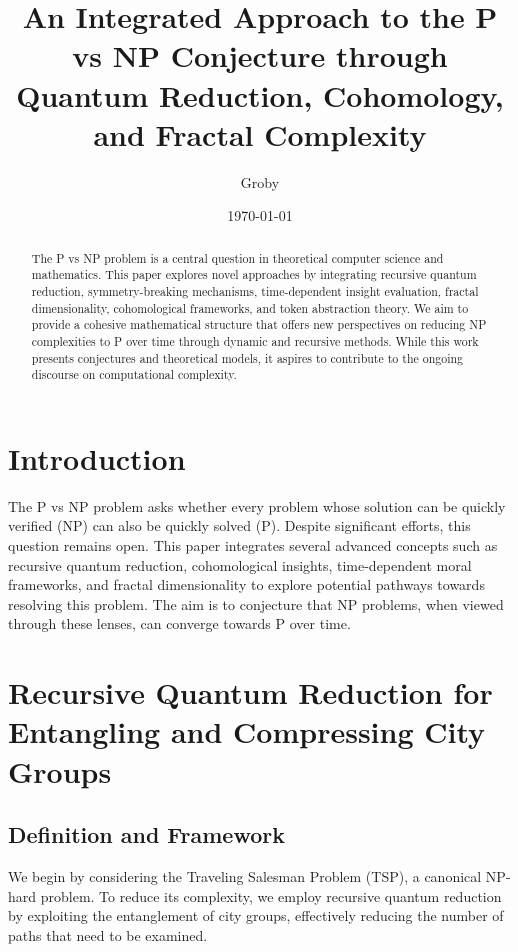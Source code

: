 \documentclass{article}
\title{An Integrated Approach to the P vs NP Conjecture through Quantum Reduction, Cohomology, and Fractal Complexity}
\author{Groby}
\date{\today}
\begin{document}
\maketitle

\begin{abstract}
The P vs NP problem is a central question in theoretical computer science and mathematics. This paper explores novel approaches by integrating recursive quantum reduction, symmetry-breaking mechanisms, time-dependent insight evaluation, fractal dimensionality, cohomological frameworks, and token abstraction theory. We aim to provide a cohesive mathematical structure that offers new perspectives on reducing NP complexities to P over time through dynamic and recursive methods. While this work presents conjectures and theoretical models, it aspires to contribute to the ongoing discourse on computational complexity.

\end{abstract}

\tableofcontents

\section{Introduction}

The P vs NP problem asks whether every problem whose solution can be quickly verified (NP) can also be quickly solved (P). Despite significant efforts, this question remains open. This paper integrates several advanced concepts such as recursive quantum reduction, cohomological insights, time-dependent moral frameworks, and fractal dimensionality to explore potential pathways towards resolving this problem. The aim is to conjecture that NP problems, when viewed through these lenses, can converge towards P over time.

\section{Recursive Quantum Reduction for Entangling and Compressing City Groups}

\subsection{Definition and Framework}

We begin by considering the Traveling Salesman Problem (TSP), a canonical NP-hard problem. To reduce its complexity, we employ recursive quantum reduction by exploiting the entanglement of city groups, effectively reducing the number of paths that need to be examined.
\end{document}

